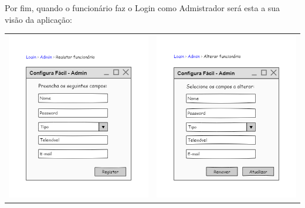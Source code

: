 Por fim, quando o funcionário faz o Login como Admistrador será esta a sua visão da aplicação:
\begin{center}
	\begin{table}[!htbp]
		\begin{tabular}{cc}
 			\includegraphics[width = 3in]{Prototipagem/registar_funcionrio.png} & \includegraphics[width = 3in]{Prototipagem/alterar_funcionrio.png}
		\end{tabular}
	\end{table}

\end{center}